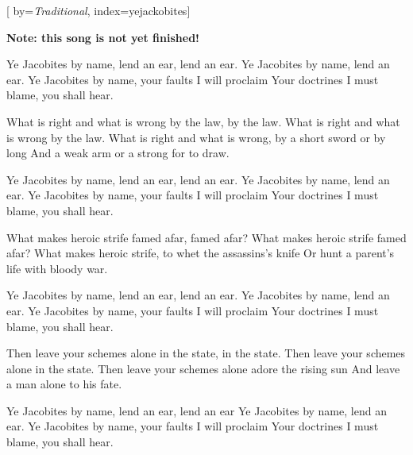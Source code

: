 
[%
    by={\textit{Traditional}},
    index={yejackobites}]


    \label{yejackobites}

    \textbf{Note: this song is not yet finished!}

    \beginchorus
        Ye Jacobites by name, lend an ear, lend an ear.
        Ye Jacobites by name, lend an ear.
        Ye Jacobites by name, your faults I will proclaim
        Your doctrines I must blame, you shall hear.
    \endchorus

    \beginverse
        What is right and what is wrong by the law, by the law.
        What is right and what is wrong by the law.
        What is right and what is wrong, by a short sword or by long
        And a weak arm or a strong for to draw.
    \endverse

    \beginchorus
        Ye Jacobites by name, lend an ear, lend an ear.
        Ye Jacobites by name, lend an ear.
        Ye Jacobites by name, your faults I will proclaim
        Your doctrines I must blame, you shall hear.
    \endchorus

    \beginverse
        What makes heroic strife famed afar, famed afar?
        What makes heroic strife famed afar?
        What makes heroic strife, to whet the assassins's knife
        Or hunt a parent's life with bloody war.
    \endverse

    \beginchorus
        Ye Jacobites by name, lend an ear, lend an ear.
        Ye Jacobites by name, lend an ear.
        Ye Jacobites by name, your faults I will proclaim
        Your doctrines I must blame, you shall hear.
    \endchorus

    \beginverse
        Then leave your schemes alone in the state, in the state.
        Then leave your schemes alone in the state.
        Then leave your schemes alone adore the rising sun
        And leave a man alone to his fate.
    \endverse

    \beginchorus
        Ye Jacobites by name, lend an ear, lend an ear
        Ye Jacobites by name, lend an ear.
        Ye Jacobites by name, your faults I will proclaim
        Your doctrines I must blame, you shall hear.
    \endchorus
\endsong
